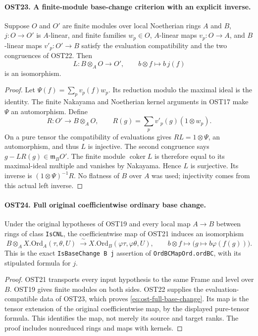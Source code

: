 \paragraph{OST23. A finite-module base-change criterion with an explicit inverse.}
\label{claim:OST23}
Suppose $O$ and $O'$ are finite modules over local Noetherian
rings $A$ and $B$, $j:O\to O'$ is $A$-linear, and finite
families $w_p\in O$, $A$-linear maps $v_p:O\to A$, and
$B$-linear maps $v'_p:O'\to B$ satisfy the evaluation
compatibility and the two congruences
of OST22.  Then
\[
 L:B\otimes_A O\longrightarrow O',\qquad b\otimes f\longmapsto b\,j(f)
\]
is an isomorphism.
\begin{proof}
Let $\Psi(f)=\sum_p v_p(f)w_p$.  Its reduction modulo
the maximal ideal is the identity.  The finite Nakayama and
Noetherian kernel arguments in OST17 make $\Psi$ an
automorphism.  Define
\[
 R:O'\longrightarrow B\otimes_AO,\qquad
         R(g)=\sum_p v'_p(g)(1\otimes w_p).
\]
On a pure tensor the compatibility of evaluations gives
$RL=1\otimes\Psi$, an automorphism, and thus $L$ is
injective.  The second congruence says
$g-LR(g)\in\mathfrak m_BO'$.  The finite module
$\operatorname{coker}L$ is therefore equal to its maximal-ideal
multiple and vanishes by Nakayama.  Hence $L$ is surjective.
Its inverse is $(1\otimes\Psi)^{-1}R$.
No flatness of $B$ over $A$ was used; injectivity comes from
this actual left inverse.
\end{proof}

\paragraph{OST24. Full original coefficientwise ordinary base change.}
\label{claim:OST24}
Under the original hypotheses of OST19 and every local map
$A\to B$ between rings of class \texttt{IsCNL}, the
coefficientwise map of OST21 induces an isomorphism
\begin{equation}\label{eq:ost-full-base-change}
 B\otimes_A X.\mathrm{Ord}_A(\tau,\theta,U)
       \ \xrightarrow{\ \sim\ }
 X.\mathrm{Ord}_B(\varphi\tau,\varphi\theta,U),
 \qquad b\otimes f\longmapsto\bigl(g\mapsto b\varphi(f(g))\bigr).
\end{equation}
This is the exact \texttt{IsBaseChange B j} assertion of
\texttt{OrdBCMapOrd.ordBC}, with its stipulated formula for $j$.
\begin{proof}
OST21 transports every input hypothesis to the same Frame
and level over $B$.  OST19 gives finite modules on both sides.
OST22 supplies the evaluation-compatible data of OST23, which
proves \eqref{eq:ost-full-base-change}.  Its map is the
tensor extension of the original coefficientwise map, by the
displayed pure-tensor formula.  This identifies the map, not
merely its source and target ranks.  The proof includes
nonreduced rings and maps with kernels.
\end{proof}

